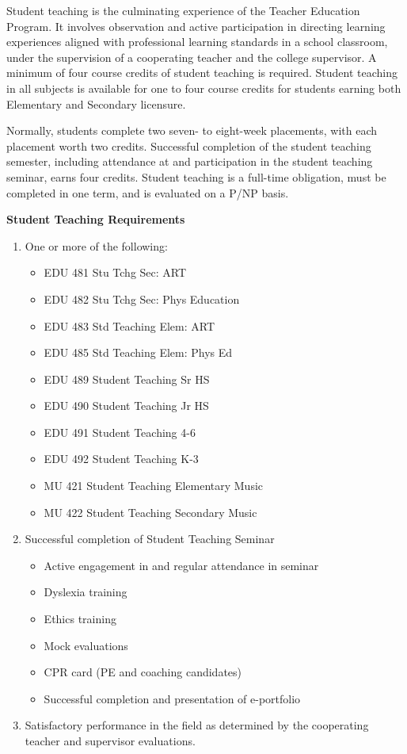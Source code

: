 \documentclass[
  letterpaper,
]{scrbook}
\providecommand{\tightlist}{%
  \setlength{\itemsep}{0pt}\setlength{\parskip}{0pt}}
\begin{document}
Student teaching is the culminating experience of the Teacher Education
Program. It involves observation and active participation in directing
learning experiences aligned with professional learning standards in a
school classroom, under the supervision of a cooperating teacher and the
college supervisor. A minimum of four course credits of student teaching
is required. Student teaching in all subjects is available for one to
four course credits for students earning both Elementary and Secondary
licensure.

Normally, students complete two seven- to eight-week placements, with
each placement worth two credits. Successful completion of the student
teaching semester, including attendance at and participation in the
student teaching seminar, earns four credits. Student teaching is a
full-time obligation, must be completed in one term, and is evaluated on
a P/NP basis.

\textbf{Student Teaching Requirements}

\begin{enumerate}
\def\labelenumi{\arabic{enumi}.}
\tightlist
\item
  One or more of the following:

  \begin{itemize}
  \tightlist
  \item
    EDU 481 Stu Tchg Sec: ART
  \item
    EDU 482 Stu Tchg Sec: Phys Education
  \item
    EDU 483 Std Teaching Elem: ART
  \item
    EDU 485 Std Teaching Elem: Phys Ed
  \item
    EDU 489 Student Teaching Sr HS
  \item
    EDU 490 Student Teaching Jr HS
  \item
    EDU 491 Student Teaching 4-6
  \item
    EDU 492 Student Teaching K-3
  \item
    MU 421 Student Teaching Elementary Music
  \item
    MU 422 Student Teaching Secondary Music
  \end{itemize}
\item
  Successful completion of Student Teaching Seminar

  \begin{itemize}
  \tightlist
  \item
    Active engagement in and regular attendance in seminar
  \item
    Dyslexia training
  \item
    Ethics training
  \item
    Mock evaluations
  \item
    CPR card (PE and coaching candidates)
  \item
    Successful completion and presentation of e-portfolio
  \end{itemize}
\item
  Satisfactory performance in the field as determined by the cooperating
  teacher and supervisor evaluations.
\end{enumerate}
\end{document}
